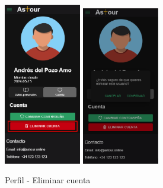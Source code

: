 \begin{enumerate}
	      \begin{figure}[H]
		      \centering
		      \includegraphics[width=0.3\textwidth]{7-Construccion/Manuales/mobile/eliminar cuenta.png}
		      \includegraphics[width=0.3\textwidth]{7-Construccion/Manuales/mobile/confirmar eliminacion cuenta.png}
		      \caption{Perfil - Eliminar cuenta}
	      \end{figure}
\end{enumerate}

